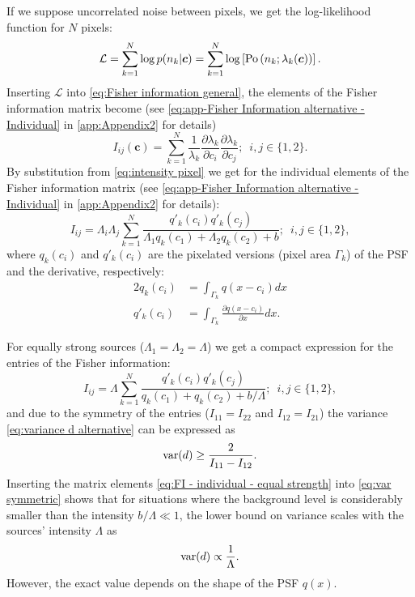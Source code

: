 If we suppose uncorrelated noise between pixels, we get the log-likelihood function for $N$ pixels: 
%
\begin{equation}
	\mathcal{L}=\sum_{k=1}^N\log p(n_k|\bm{c})=\sum_{k=1}^N\log\left[\mathrm{Po}\left(n_k;\lambda_k(\bm{c})\right)\right].
	\label{eq:FREM likelihood Poisson}
\end{equation}
%
Inserting $\mathcal{L}$ into \autoref{eq:Fisher information general}, the elements of the Fisher information matrix become (see \autoref{eq:app-Fisher Information alternative - Individual} in \autoref{app:Appendix2} for details)
%
\begin{equation}
	I_{ij}(\bm{c})=\sum_{k=1}^N\frac{1}{\lambda_k}\frac{\partial\lambda_k}{\partial c_i}\frac{\partial\lambda_k}{\partial c_j};\; \ i,j\in\{1,2\}.
	\label{eq:FI - entries}
\end{equation}
%
By substitution from \autoref{eq:intensity pixel} we get for the individual elements of the Fisher information matrix (see \autoref{eq:app-Fisher Information alternative - Individual} in \autoref{app:Appendix2} for details): 
%
\begin{equation}
	I_{ij} =\Lambda_i\Lambda_j\sum_{k=1}^N\frac{q'_k(c_i)q'_k(c_j)}{\Lambda_1q_k(c_1)+\Lambda_2q_k(c_2)+b};\; \ i,j\in\{1,2\},
	\label{eq:FI - individual}
\end{equation}
%
where $q_k(c_i)$ and $q'_k(c_i)$ are the pixelated versions (pixel area $\Gamma_k$) of the PSF and the derivative, respectively:
%
\begin{alignat*}{2}
	q_k(c_i) & =\int_{\Gamma_k}q(x-c_i)dx\\
	q'_k(c_i) & =\int_{\Gamma_k}\frac{\partial q(x-c_i)}{\partial x}dx.
\end{alignat*}

For equally strong sources ($\Lambda_1=\Lambda_2=\Lambda$) we get a compact expression for the entries of the Fisher information: 
%
\begin{equation}
	I_{ij} =\Lambda\sum_{k=1}^N\frac{q'_k(c_i)q'_k(c_j)}{q_k(c_1)+q_k(c_2)+b/\Lambda};\; \ i,j\in\{1,2\},
	\label{eq:FI - individual - equal strength}
\end{equation}
%
and due to the symmetry of the entries ($I_{11}=I_{22}$ and $I_{12}=I_{21}$) the variance \autoref{eq:variance d alternative} can be expressed as
%
\begin{equation}
	\mathrm{var}(d)\geq\frac{2}{I_{11}-I_{12}}.
	\label{eq:var symmetric}
\end{equation}
%
Inserting the matrix elements \autoref{eq:FI - individual - equal strength} into \autoref{eq:var symmetric} shows that for situations where the background level is considerably smaller than the intensity $b/\Lambda\ll1$, the lower bound on variance scales with the sources' intensity $\Lambda$ as
%
\begin{equation}
	\mathrm{var}(d)\propto\frac{1}{\Lambda}. 
\end{equation}
%
However, the exact value depends on the shape of the PSF $q(x)$.


